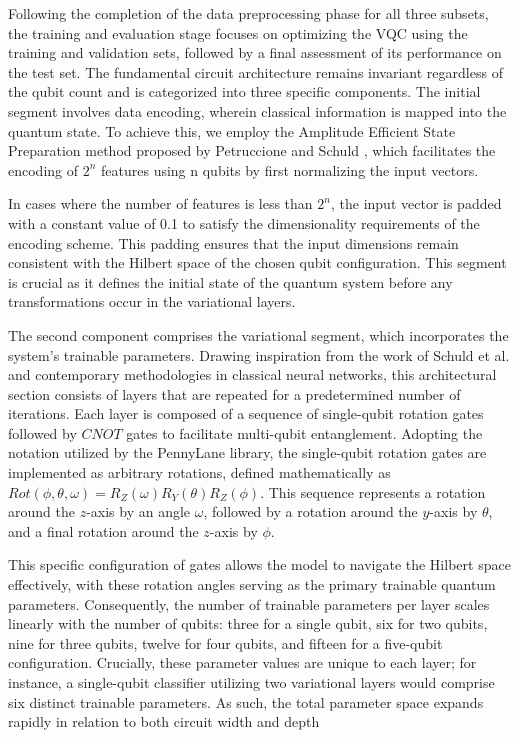\documentclass[en]{dimscthesis}
\begin{document}
Following the completion of the data preprocessing phase for all three subsets, the training and evaluation stage focuses on optimizing the VQC using the training and validation sets, followed by a final assessment of its performance on the test set. The fundamental circuit architecture remains invariant regardless of the qubit count and is categorized into three specific components. The initial segment involves data encoding, wherein classical information is mapped into the quantum state. To achieve this, we employ the Amplitude Efficient State Preparation method proposed by Petruccione and Schuld \cite{bib:schuld_petruccione}, which facilitates the encoding of \(2^n\) features using n qubits by first normalizing the input vectors.

In cases where the number of features is less than \(2^n\), the input vector is padded with a constant value of 0.1 to satisfy the dimensionality requirements of the encoding scheme. This padding ensures that the input dimensions remain consistent with the Hilbert space of the chosen qubit configuration. This segment is crucial as it defines the initial state of the quantum system before any transformations occur in the variational layers.

The second component comprises the variational segment, which incorporates the system's trainable parameters. Drawing inspiration from the work of Schuld et al.\cite{bib:Schuld_2020} and contemporary methodologies in classical neural networks, this architectural section consists of layers that are repeated for a predetermined number of iterations. Each layer is composed of a sequence of single-qubit rotation gates followed by $CNOT$ gates to facilitate multi-qubit entanglement. Adopting the notation utilized by the PennyLane library, the single-qubit rotation gates are implemented as arbitrary rotations, defined mathematically as $Rot(\phi, \theta, \omega) = R_Z(\omega) R_Y(\theta) R_Z(\phi)$. This sequence represents a rotation around the $z$-axis by an angle $\omega$, followed by a rotation around the $y$-axis by $\theta$, and a final rotation around the $z$-axis by $\phi$.

This specific configuration of gates allows the model to navigate the Hilbert space effectively, with these rotation angles serving as the primary trainable quantum parameters. Consequently, the number of trainable parameters per layer scales linearly with the number of qubits: three for a single qubit, six for two qubits, nine for three qubits, twelve for four qubits, and fifteen for a five-qubit configuration. Crucially, these parameter values are unique to each layer; for instance, a single-qubit classifier utilizing two variational layers would comprise six distinct trainable parameters. As such, the total parameter space expands rapidly in relation to both circuit width and depth
\end{document}
